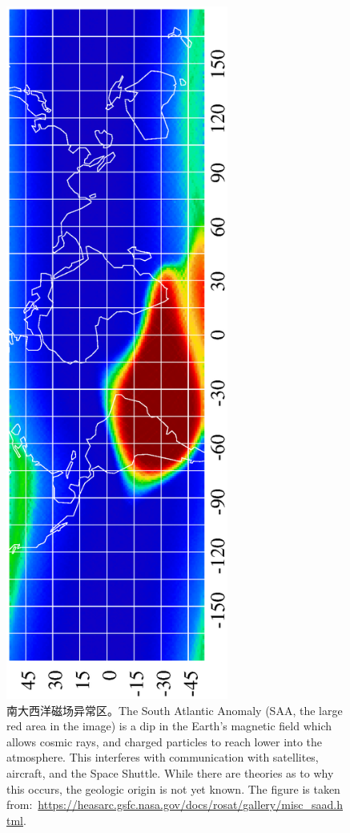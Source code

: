 \begin{figure}
\centering
\includegraphics[width=0.65\textwidth,angle=-90]{figs/saad.ps}
\caption{南大西洋磁场异常区。The South Atlantic Anomaly (SAA, the large red area in the image)
is a dip in the Earth's magnetic field which allows cosmic rays, and charged particles to
reach lower into the atmosphere. This interferes with communication with satellites, aircraft,
and the Space Shuttle. While there are theories as to why this occurs, the geologic origin
is not yet known. The figure is taken
from:~\url{https://heasarc.gsfc.nasa.gov/docs/rosat/gallery/misc_saad.html}.}
\label{fig:saad2}
\end{figure}

